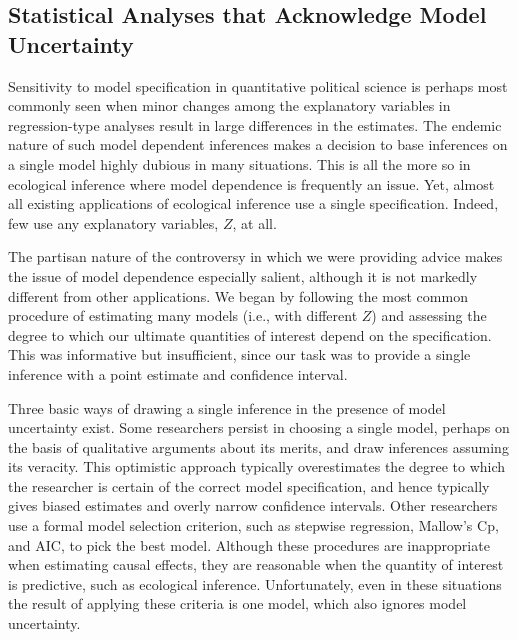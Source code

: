 \documentclass[11pt,titlepage]{article}
\begin{document}
\subsection{Statistical Analyses that Acknowledge Model Uncertainty}\label{s:multmodel}

Sensitivity to model specification in quantitative political science
is perhaps most commonly seen when minor changes among the explanatory
variables in regression-type analyses result in large differences in
the estimates.  The endemic nature of such model dependent inferences
makes a decision to base inferences on a single model highly dubious
in many situations.  This is all the more so in ecological inference
where model dependence is frequently an issue.  Yet, almost all
existing applications of ecological inference use a single
specification.  Indeed, few use any explanatory variables, $Z$, at
all.

The partisan nature of the controversy in which we were providing
advice makes the issue of model dependence especially salient,
although it is not markedly different from other applications.  We
began by following the most common procedure of estimating many models
(i.e., with different $Z$) and assessing the degree to which our
ultimate quantities of interest depend on the specification.  This was
informative but insufficient, since our task was to provide a single
inference with a point estimate and confidence interval.

Three basic ways of drawing a single inference in the presence of
model uncertainty exist.  Some researchers persist in choosing a
single model, perhaps on the basis of qualitative arguments about its
merits, and draw inferences assuming its veracity.  This optimistic
approach typically overestimates the degree to which the researcher is
certain of the correct model specification, and hence typically gives
biased estimates and overly narrow confidence intervals.  Other
researchers use a formal model selection criterion, such as stepwise
regression, Mallow's Cp, and AIC, to pick the best model.  Although
these procedures are inappropriate when estimating causal effects,
they are reasonable when the quantity of interest is predictive, such
as ecological inference.  Unfortunately, even in these situations the
result of applying these criteria is one model, which also ignores
model uncertainty.
\end{document}
